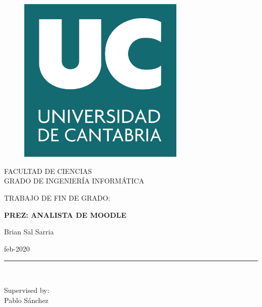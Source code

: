 \documentclass[a4paper,openright,12pt]{report}
\begin{document}
\begin{titlepage}

\begin{center}
\vspace*{-1in}
\begin{figure}[htb]
\begin{center}
\includegraphics[width=8cm]{./figuras/logo}
\end{center}
\end{figure}

FACULTAD DE CIENCIAS\\
\vspace*{0.15in}
GRADO DE INGENIER\'IA INFORMÁTICA \\
\vspace*{0.6in}
\begin{large}
TRABAJO DE FIN DE GRADO:\\
\end{large}
\vspace*{0.2in}
\begin{Large}
\textbf{PREZ: ANALISTA DE MOODLE} \\
\end{Large}
\vspace*{0.3in}
\begin{large}
Brian Sal Sarria\\
\end{large}
\vspace*{0.1in}
\begin{large}
feb-2020\\
\end{large}
\rule{80mm}{0.1mm}\\
\vspace*{0.1in}
\begin{large}
Supervised by: \\
Pablo S\'anchez \\
\end{large}
\end{center}

\end{titlepage}
\end{document}
